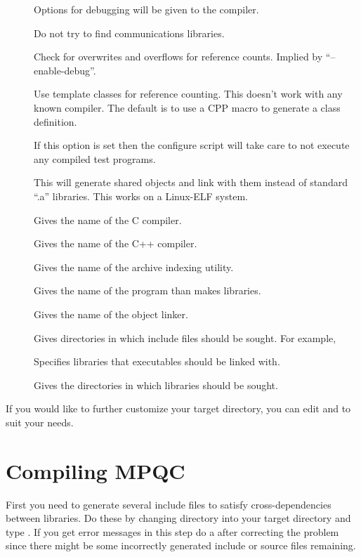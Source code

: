 \begin{description}
\item[] Options for debugging will be given to
the compiler.
\item[] Do not try to find communications
libraries.
\item[] Check for overwrites and overflows
for reference counts.  Implied by ``--enable-debug''.
\item[] Use template classes for reference
counting.  This doesn't work with any known compiler.  The default is to
use a CPP macro to generate a class definition.
\item[] If this option is set then the
configure script will take care to not execute any compiled test programs.
\item[] This will generate shared objects and
link with them instead of standard ``.a'' libraries.  This works on a
Linux-ELF system.
\item[] Gives the name of the C compiler.
\item[] Gives the name of the C++ compiler.
\item[] Gives the name of the archive indexing utility.
\item[] Gives the name of the program than makes libraries.
\item[] Gives the name of the object linker.
\item[] Gives directories in which include files
should be sought.  For example, 
\item[] Specifies libraries that executables should be
linked with.
\item[] Gives the directories in which libraries
should be sought.
\end{description}

  If you would like to further customize your target directory,
you can edit  and  to
suit your needs.

\section{Compiling MPQC}

 First you need to generate several include files to satisfy
cross-dependencies between libraries.  Do these by changing directory into
your target directory and type .  If you get error
messages in this step do a  after correcting the
problem since there might be some incorrectly generated include or source
files remaining.

